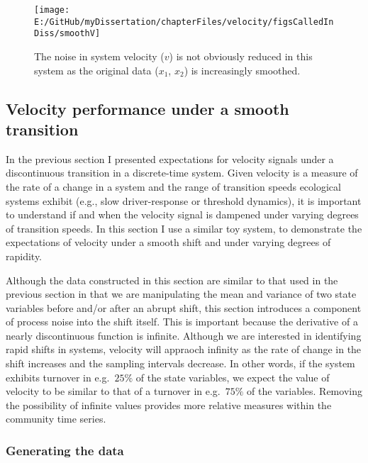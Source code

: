 \documentclass[]{article}
\begin{document}
\begin{figure}

{\centering \texttt{[image: E:/GitHub/myDissertation/chapterFiles/velocity/figsCalledInDiss/smoothV]} 

}

\caption{The noise in system velocity ($v$) is not obviously reduced in this system as the original data ($x_1$, $x_2$) is increasingly smoothed.}\label{fig:smoothV}
\end{figure}

\hypertarget{velocity-performance-under-a-smooth-transition}{%
\subsection{Velocity performance under a smooth
transition}\label{velocity-performance-under-a-smooth-transition}}

In the previous section I presented expectations for velocity signals
under a discontinuous transition in a discrete-time system. Given
velocity is a measure of the rate of a change in a system and the range
of transition speeds ecological systems exhibit (e.g., slow
driver-response or threshold dynamics), it is important to understand if
and when the velocity signal is dampened under varying degrees of
transition speeds. In this section I use a similar toy system, to
demonstrate the expectations of velocity under a smooth shift and under
varying degrees of rapidity.

Although the data constructed in this section are similar to that used
in the previous section in that we are manipulating the mean and
variance of two state variables before and/or after an abrupt shift,
this section introduces a component of process noise into the shift
itself. This is important because the derivative of a nearly
discontinuous function is infinite. Although we are interested in
identifying rapid shifts in systems, velocity will appraoch infinity as
the rate of change in the shift increases and the sampling intervals
decrease. In other words, if the system exhibits turnover in
e.g.~\(25\%\) of the state variables, we expect the value of velocity to
be similar to that of a turnover in e.g.~\(75\%\) of the variables.
Removing the possibility of infinite values provides more relative
measures within the community time series.

\hypertarget{generating-the-data}{%
\subsubsection{Generating the data}\label{generating-the-data}}
\end{document}
